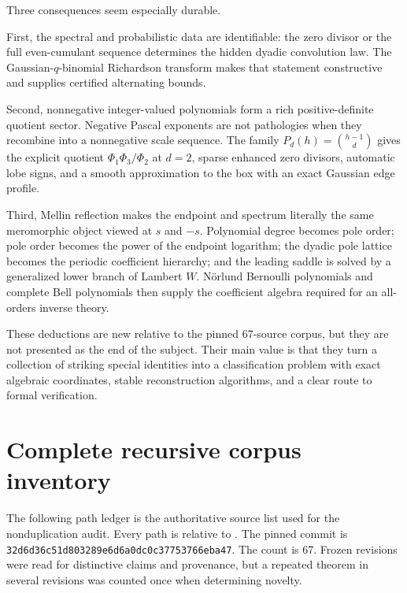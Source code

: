 \documentclass[11pt,oneside]{article}
\numberwithin{equation}{section}
\theoremstyle{definition}
\theoremstyle{remark}
\begin{document}
Three consequences seem especially durable.

First, the spectral and probabilistic data are identifiable: the zero divisor or the full
even-cumulant sequence determines the hidden dyadic convolution law.  The
Gaussian-$q$-binomial Richardson transform makes that statement constructive and supplies
certified alternating bounds.

Second, nonnegative integer-valued polynomials form a rich positive-definite quotient sector.
Negative Pascal exponents are not pathologies when they recombine into a nonnegative scale
sequence.  The family
$P_d(h)=\binom{h-1}{d}$ gives the explicit quotient
$\Phi_1\Phi_3/\Phi_2$ at $d=2$, sparse enhanced zero divisors, automatic lobe signs, and a
smooth approximation to the box with an exact Gaussian edge profile.

Third, Mellin reflection makes the endpoint and spectrum literally the same meromorphic
object viewed at $s$ and $-s$.  Polynomial degree becomes pole order; pole order becomes the
power of the endpoint logarithm; the dyadic pole lattice becomes the periodic coefficient
hierarchy; and the leading saddle is solved by a generalized lower branch of Lambert $W$.
N\"orlund Bernoulli polynomials and complete Bell polynomials then supply the coefficient
algebra required for an all-orders inverse theory.

These deductions are new relative to the pinned 67-source corpus, but they are not presented
as the end of the subject.  Their main value is that they turn a collection of striking
special identities into a classification problem with exact algebraic coordinates, stable
reconstruction algorithms, and a clear route to formal verification.

\appendix
\section{Complete recursive corpus inventory}
\label{app:inventory}

The following path ledger is the authoritative source list used for the nonduplication audit.
Every path is relative to .  The pinned commit is
\texttt{32d6d36c51d803289e6d6a0dc0c37753766eba47}.  The count is 67.  Frozen revisions were
read for distinctive claims and provenance, but a repeated theorem in several revisions was
counted once when determining novelty.
\end{document}
